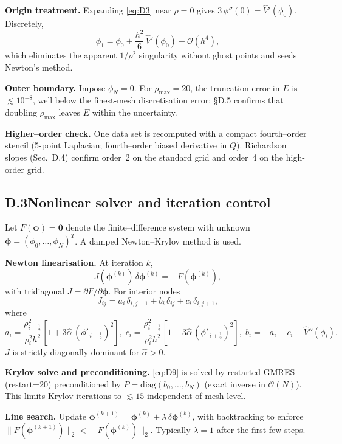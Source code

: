 \documentclass{article}
\begin{document}
\textbf{Origin treatment.}
Expanding \eqref{eq:D3} near $\rho=0$ gives $3\,\phi''(0)=\widehat{V}'(\phi_0)$. Discretely,
\begin{equation}
\phi_1=\phi_0+\frac{h^2}{6}\,\widehat{V}'(\phi_0)+\mathcal{O}(h^4),
\label{eq:D8}
\end{equation}
which eliminates the apparent $1/\rho^2$ singularity without ghost points and seeds Newton’s method.

\textbf{Outer boundary.}
Impose $\phi_N=0$. For $\rho_{\max}=20$, the truncation error in $E$ is $\lesssim10^{-8}$, well below the finest-mesh discretisation error; §D.5 confirms that doubling $\rho_{\max}$ leaves $E$ within the uncertainty.

\textbf{Higher–order check.}
One data set is recomputed with a compact fourth–order stencil (5-point Laplacian; fourth–order biased derivative in $Q$). Richardson slopes (Sec.~D.4) confirm order~2 on the standard grid and order~4 on the high-order grid.

\subsection*{D.3\;\;Nonlinear solver and iteration control}

Let $F(\boldsymbol\phi)=\mathbf{0}$ denote the finite–difference system with unknown $\boldsymbol\phi=(\phi_0,\dots,\phi_N)^T$. A damped Newton–Krylov method is used.

\textbf{Newton linearisation.}
At iteration $k$,
\begin{equation}
J(\boldsymbol\phi^{(k)})\,\delta\boldsymbol\phi^{(k)}=-F(\boldsymbol\phi^{(k)}),
\label{eq:D9}
\end{equation}
with tridiagonal $J=\partial F/\partial\boldsymbol\phi$. For interior nodes
\[
J_{ij}=a_i\,\delta_{i,j-1}+b_i\,\delta_{ij}+c_i\,\delta_{i,j+1},
\]
where
\[
a_i=\frac{\rho_{i-\frac12}^2}{\rho_i^2 h^2}\left[1+3\hat{\alpha}\,(\phi'_{\,i-\frac12})^2\right],\;
c_i=\frac{\rho_{i+\frac12}^2}{\rho_i^2 h^2}\left[1+3\hat{\alpha}\,(\phi'_{\,i+\frac12})^2\right],\;
b_i=-a_i-c_i-\widehat{V}''(\phi_i).
\]
$J$ is strictly diagonally dominant for $\hat{\alpha}>0$.

\textbf{Krylov solve and preconditioning.}
\eqref{eq:D9} is solved by restarted GMRES (restart=20) preconditioned by $P=\mathrm{diag}(b_0,\dots,b_N)$ (exact inverse in $\mathcal{O}(N)$). This limits Krylov iterations to $\lesssim15$ independent of mesh level.

\textbf{Line search.}
Update $\boldsymbol\phi^{(k+1)}=\boldsymbol\phi^{(k)}+\lambda\,\delta\boldsymbol\phi^{(k)}$, with backtracking to enforce $\|F(\boldsymbol\phi^{(k+1)})\|_2<\|F(\boldsymbol\phi^{(k)})\|_2$. Typically $\lambda=1$ after the first few steps.
\end{document}
